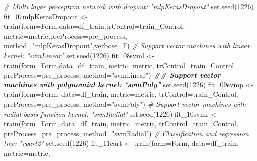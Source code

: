 \documentclass[
]{article}
\newenvironment{Shaded}{\begin{snugshade}}{\end{snugshade}}
\newcommand{\AttributeTok}[1]{\textcolor[rgb]{0.77,0.63,0.00}{#1}}
\newcommand{\CommentTok}[1]{\textcolor[rgb]{0.56,0.35,0.01}{\textit{#1}}}
\newcommand{\DecValTok}[1]{\textcolor[rgb]{0.00,0.00,0.81}{#1}}
\newcommand{\DocumentationTok}[1]{\textcolor[rgb]{0.56,0.35,0.01}{\textbf{\textit{#1}}}}
\newcommand{\FunctionTok}[1]{\textcolor[rgb]{0.00,0.00,0.00}{#1}}
\newcommand{\NormalTok}[1]{#1}
\newcommand{\OtherTok}[1]{\textcolor[rgb]{0.56,0.35,0.01}{#1}}
\newcommand{\StringTok}[1]{\textcolor[rgb]{0.31,0.60,0.02}{#1}}
\begin{document}
\begin{Shaded}
\begin{Highlighting}[]
\CommentTok{\# Multi layer perceptron network with dropout: "mlpKerasDropout"}
\FunctionTok{set.seed}\NormalTok{(}\DecValTok{1226}\NormalTok{)}
\NormalTok{fit\_07mlpKerasDropout }\OtherTok{\textless{}{-}} \FunctionTok{train}\NormalTok{(}\AttributeTok{form=}\NormalTok{Form,}\AttributeTok{data=}\NormalTok{df\_train,}\AttributeTok{trControl=}\NormalTok{train\_Control,}
                               \AttributeTok{metric=}\NormalTok{metric,}\AttributeTok{preProcess=}\NormalTok{pre\_process,}
                               \AttributeTok{method=}\StringTok{"mlpKerasDropout"}\NormalTok{,}\AttributeTok{verbose=}\NormalTok{F)}
\CommentTok{\# Support vector machines with linear kernel: "svmLinear"}
\FunctionTok{set.seed}\NormalTok{(}\DecValTok{1226}\NormalTok{)}
\NormalTok{fit\_08svml }\OtherTok{\textless{}{-}} \FunctionTok{train}\NormalTok{(}\AttributeTok{form=}\NormalTok{Form,}\AttributeTok{data=}\NormalTok{df\_train, }\AttributeTok{metric=}\NormalTok{metric,}
                    \AttributeTok{trControl=}\NormalTok{train\_Control, }\AttributeTok{preProcess=}\NormalTok{pre\_process,}
                    \AttributeTok{method=}\StringTok{"svmLinear"}\NormalTok{)}
\DocumentationTok{\#\# Support vector machines with polynomial kernel: "svmPoly"}
\FunctionTok{set.seed}\NormalTok{(}\DecValTok{1226}\NormalTok{)}
\NormalTok{fit\_09svmp }\OtherTok{\textless{}{-}} \FunctionTok{train}\NormalTok{(}\AttributeTok{form=}\NormalTok{Form, }\AttributeTok{data=}\NormalTok{df\_train, }\AttributeTok{metric=}\NormalTok{metric,}
                    \AttributeTok{trControl=}\NormalTok{train\_Control, }\AttributeTok{preProcess=}\NormalTok{pre\_process,}
                    \AttributeTok{method=}\StringTok{"svmPoly"}\NormalTok{)}
\CommentTok{\# Support vector machines with radial basis function kernel: "svmRadial"}
\FunctionTok{set.seed}\NormalTok{(}\DecValTok{1226}\NormalTok{)}
\NormalTok{fit\_10svmr }\OtherTok{\textless{}{-}} \FunctionTok{train}\NormalTok{(}\AttributeTok{form=}\NormalTok{Form, }\AttributeTok{data=}\NormalTok{df\_train, }\AttributeTok{metric=}\NormalTok{metric,}
                    \AttributeTok{trControl=}\NormalTok{train\_Control, }\AttributeTok{preProcess=}\NormalTok{pre\_process,}
                    \AttributeTok{method=}\StringTok{"svmRadial"}\NormalTok{)}
\CommentTok{\# Classification and regression tree: "rpart2"}
\FunctionTok{set.seed}\NormalTok{(}\DecValTok{1226}\NormalTok{)}
\NormalTok{fit\_11cart }\OtherTok{\textless{}{-}} \FunctionTok{train}\NormalTok{(}\AttributeTok{form=}\NormalTok{Form, }\AttributeTok{data=}\NormalTok{df\_train, }\AttributeTok{metric=}\NormalTok{metric,}

\end{Highlighting}
\end{Shaded}
\end{document}
